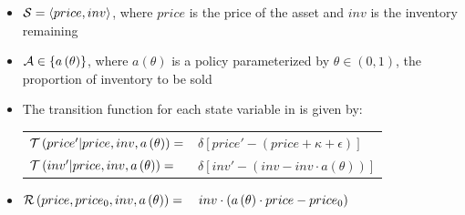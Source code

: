 \begin{itemize}
    \item {\footnotesize $ \mathcal{S} = \left\langle price, inv \right\rangle$}, where $ price $ is the price of the asset and $ inv $ is the inventory remaining
    \item {\footnotesize $ \mathcal{A} \in \left\lbrace a\left( \theta \right) \right\rbrace$}, where {\footnotesize $ a\left( \theta \right) $} is a policy parameterized by {\footnotesize $ \theta \in \left( 0, 1\right)$}, the proportion of inventory to be sold
    \item The transition function {\footnotesize \Transition} for each state variable in {\footnotesize \State} is given by:    \\
    {\footnotesize 
        \abovedisplayskip=5pt
        \belowdisplayskip=0pt
        \renewcommand{\arraystretch}{1.5}
        \begin{tabular}{ll}
            $ \mathcal{T}\left( price' | price, inv, a\left( \theta \right) \right) =$ & $\delta \left[ price' - (price + \kappa + \epsilon) \right] $ \\
            $\mathcal{T}\left( inv' | price, inv, a\left( \theta \right) \right) =$ & $\delta \left[ inv' - (inv - inv \cdot a\left( \theta \right)) \right] $ \\
        \end{tabular}
    }%
    \item {\footnotesize $ \mathcal{R}\left(price, price_0, inv, a\left( \theta \right) \right) = \\ \hspace{1em} inv \cdot \left(a\left( \theta \right) \cdot price - price_0\right)$ }
    
    
    
\end{itemize}

